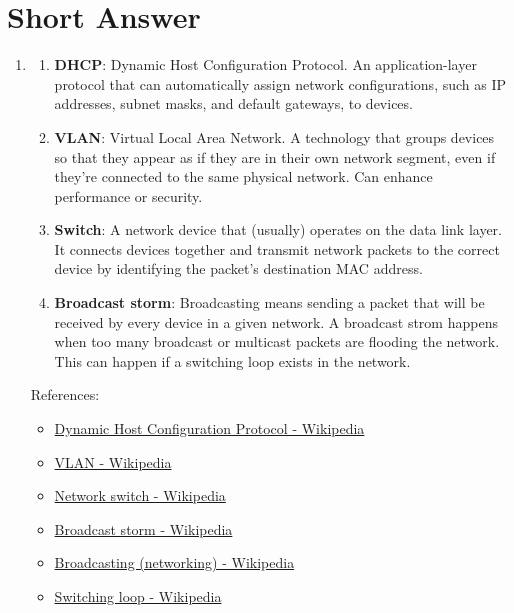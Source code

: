 \documentclass[12pt, a4paper]{article}
\begin{document}
  \section{Short Answer}
  \begin{enumerate}
    \item
    \begin{enumerate}
      \item \textbf{DHCP}: Dynamic Host Configuration Protocol. An
        application-layer protocol that can automatically assign network
        configurations, such as IP addresses, subnet masks, and default
        gateways, to devices.
      \item \textbf{VLAN}: Virtual Local Area Network. A technology that groups
        devices so that they appear as if they are in their own network segment,
        even if they're connected to the same physical network. Can enhance
        performance or security.
      \item \textbf{Switch}: A network device that (usually) operates on the
        data link layer. It connects devices together and transmit network
        packets to the correct device by identifying the packet's destination
        MAC address.
      \item \textbf{Broadcast storm}: Broadcasting means sending a packet that
        will be received by every device in a given network. A broadcast strom
        happens when too many broadcast or multicast packets are flooding the
        network. This can happen if a switching loop exists in the network.
    \end{enumerate}
    References:
    \begin{itemize}
      \item \href{https://en.wikipedia.org/wiki/Dynamic_Host_Configuration_Protocol}{Dynamic Host Configuration Protocol - Wikipedia}
      \item \href{https://en.wikipedia.org/wiki/VLAN}{VLAN - Wikipedia}
      \item \href{https://en.wikipedia.org/wiki/Network_switch}{Network switch - Wikipedia}
      \item \href{https://en.wikipedia.org/wiki/Broadcast_storm}{Broadcast storm - Wikipedia}
      \item \href{https://en.wikipedia.org/wiki/Broadcasting_(networking)}{Broadcasting (networking) - Wikipedia}
      \item \href{https://en.wikipedia.org/wiki/Switching_loop}{Switching loop - Wikipedia}
    \end{itemize}


\end{enumerate}
\end{document}
